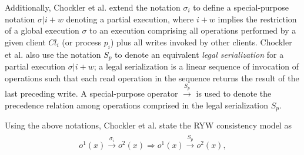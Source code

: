 \documentclass[journal,compsoc]{IEEEtran}
\begin{document}
    Additionally, Chockler et al. extend the notation $\sigma_i$ to define a special-purpose notation $\sigma |i + w$ denoting a partial
    execution, where $i + w$ implies the restriction of a global execution $\sigma$ to an execution comprising all operations performed by a given client $\mathit{Cl}_i$ (or process $p_i$) plus all writes invoked by
     other clients.  Chockler et al. also use the notation $S_p$ to denote an equivalent \emph{legal serialization} for a partial execution $\sigma |i + w$;  a legal serialization is a linear sequence of invocation of operations such that each read operation in the sequence returns the result of the last preceding write. %
      A special-purpose operator $\xrightarrow{S_p}$ is used to denote the precedence relation %
   among operations comprised in the legal serialization $S_p$.
  \par Using the above notations, Chockler et al. state the RYW consistency model as
  \begin{align}
  \begin{split}\label{chockler}
  \mathit{o}^1(x) \xrightarrow{\sigma_i} \mathit{o}^2(x) \Rightarrow \mathit{o}^1(x) \xrightarrow{S_p} \mathit{o}^2(x),
  \end{split}
  \end{align} %
\end{document}
